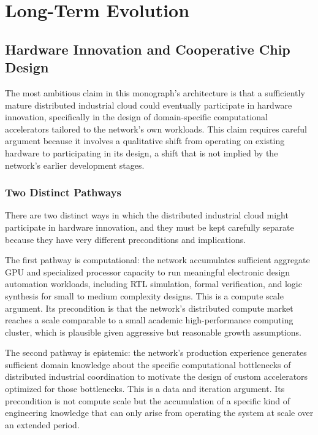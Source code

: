 \documentclass[12pt]{book}
\theoremstyle{definition}
\theoremstyle{remark}
\begin{document}
\part{Long-Term Evolution}

\chapter{Hardware Innovation and Cooperative Chip Design}

The most ambitious claim in this monograph's architecture is that a
sufficiently mature distributed industrial cloud could eventually
participate in hardware innovation, specifically in the design of
domain-specific computational accelerators tailored to the network's
own workloads. This claim requires careful argument because it
involves a qualitative shift from operating on existing hardware
to participating in its design, a shift that is not implied by the
network's earlier development stages.

\section{Two Distinct Pathways}

There are two distinct ways in which the distributed industrial cloud
might participate in hardware innovation, and they must be kept
carefully separate because they have very different preconditions and
implications.

The first pathway is computational: the network accumulates
sufficient aggregate GPU and specialized processor capacity to run
meaningful electronic design automation workloads, including RTL
simulation, formal verification, and logic synthesis for small to
medium complexity designs. This is a compute scale argument. Its
precondition is that the network's distributed compute market reaches
a scale comparable to a small academic high-performance computing
cluster, which is plausible given aggressive but reasonable growth
assumptions.

The second pathway is epistemic: the network's production experience
generates sufficient domain knowledge about the specific computational
bottlenecks of distributed industrial coordination to motivate the
design of custom accelerators optimized for those bottlenecks.
This is a data and iteration argument. Its precondition is not
compute scale but the accumulation of a specific kind of engineering
knowledge that can only arise from operating the system at scale
over an extended period.
\end{document}
